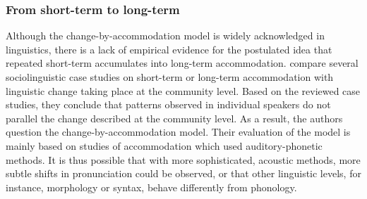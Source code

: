 \documentclass[output=paper,
modfonts
]{langscibook}
\begin{document}
\subsubsection*{From short-term to long-term}

Although the change-by-accommodation model is widely acknowledged in linguistics, there is a lack of empirical evidence for the postulated idea that repeated short-term accumulates into long-term accommodation.
\cite{auer_role_2005} compare several sociolinguistic case studies on short-term or long-term accommodation with linguistic change taking place at the community level. Based on the reviewed case studies, they conclude that patterns observed in individual speakers do not parallel the change described at the community level. As a result, the authors question the change-by-accommodation model. Their evaluation of the model is mainly based on studies of accommodation which used auditory-phonetic methods. It is thus possible that with more sophisticated, acoustic methods, more subtle shifts in pronunciation could be observed, or that other linguistic levels, for instance, morphology or syntax, behave differently from phonology. 
 
\end{document}
